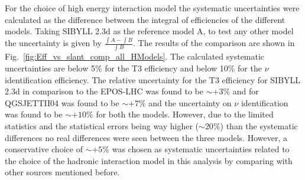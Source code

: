 For the choice of high energy interaction model the systematic uncertainties were calculated as the difference between the integral of efficiencies of the different models. Taking SIBYLL 2.3d as the reference model A, to test any other model the uncertainty is given by $\frac{\int A - \int B}{\int B}$. The results of the comparison are shown in Fig.~\ref{fig:Eff_vs_slant_comp_all_HModels}. The calculated systematic uncertainties are below 5\% for the T3 efficiency and below 10\% for the $\nu$ identification efficiency. The relative uncertainty for the T3 efficiency for SIBYLL 2.3d in comparison to the EPOS-LHC was found to be $\sim +3\%$ and for QGSJETTII04 was found to be $\sim + 7\%$ and the uncertainty on $\nu$ identification was found to be $\sim +10\%$ for both the models. However, due to the limited statistics and the statistical errors being way higher ($\sim 20\%$) than the systematic differences no real differences were seen between the three models. However, a conservative choice of $\sim +5\%$ was chosen as systematic uncertainties related to the choice of the hadronic interaction model in this analysis by comparing with other sources mentioned before.  


